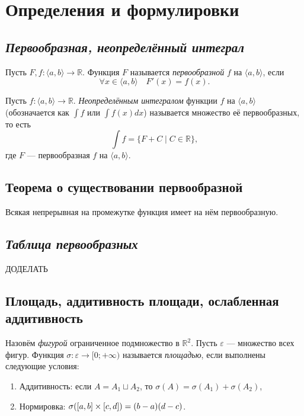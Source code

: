 \section{Определения и формулировки}

\subsection{\itshape Первообразная, неопределённый интеграл}
 
\begin{definition}
	Пусть $F, f \colon \langle a, b \rangle \to \mathbb{R}$.
	Функция $F$ называется \textit{первообразной} $f$ на $\langle a, b \rangle$, если \[
		\forall x \in \langle a, b \rangle \quad F'(x) = f(x).
	\]
\end{definition}

\begin{definition}
	Пусть $f \colon \langle a, b \rangle \to \mathbb{R}$.
	\textit{Неопределённым интегралом} функции $f$ на $\langle a, b \rangle$
	(обозначается как $\int f$ или $\int f(x) dx$) называется множество её первообразных,
	то есть \[
		\int f = \{ F + C \mid C \in \mathbb{R} \},
	\]
	где $F$ --- первообразная $f$ на $\langle a, b \rangle$.
\end{definition}

\subsection{Теорема о существовании первообразной}

\begin{theorem}
	Всякая непрерывная на промежутке функция имеет на нём первообразную.
\end{theorem}

\subsection{\itshape Таблица первообразных}

ДОДЕЛАТЬ

\subsection{Площадь, аддитивность площади, ослабленная аддитивность}

\begin{definition}
	Назовём \textit{фигурой} ограниченное подмножество в $\mathbb{R}^2$.
	Пусть $\varepsilon$ --- множество всех фигур. Функция $\sigma \colon \varepsilon \to [0; +\infty)$ называется \textit{площадью},
	если выполнены следующие условия:
	\begin{enumerate}
		\item Аддитивность: если $A = A_1 \sqcup A_2$, то $\sigma (A) = \sigma (A_1) + \sigma (A_2)$,
		\item Нормировка: $\hbox{$\sigma ([a, b] \times [c, d])$} = (b - a) (d - c)$.
	\end{enumerate}
\end{definition}


